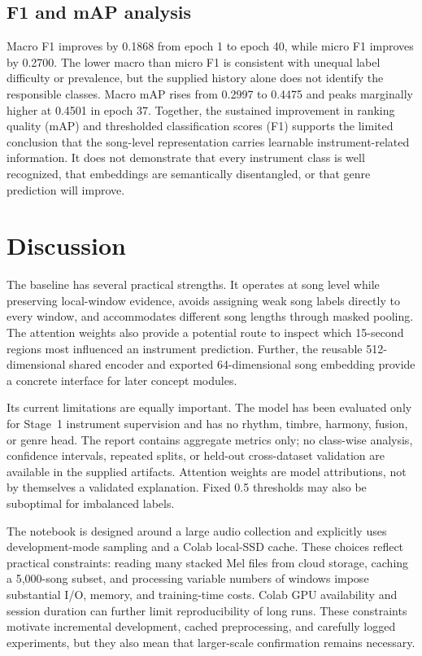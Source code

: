 \documentclass[conference]{IEEEtran}
\begin{document}
\subsection{F1 and mAP analysis}
Macro F1 improves by 0.1868 from epoch 1 to epoch 40, while micro F1 improves by 0.2700. The lower macro than micro F1 is consistent with unequal label difficulty or prevalence, but the supplied history alone does not identify the responsible classes. Macro mAP rises from 0.2997 to 0.4475 and peaks marginally higher at 0.4501 in epoch 37. Together, the sustained improvement in ranking quality (mAP) and thresholded classification scores (F1) supports the limited conclusion that the song-level representation carries learnable instrument-related information. It does not demonstrate that every instrument class is well recognized, that embeddings are semantically disentangled, or that genre prediction will improve.

\section{Discussion}
The baseline has several practical strengths. It operates at song level while preserving local-window evidence, avoids assigning weak song labels directly to every window, and accommodates different song lengths through masked pooling. The attention weights also provide a potential route to inspect which 15-second regions most influenced an instrument prediction. Further, the reusable 512-dimensional shared encoder and exported 64-dimensional song embedding provide a concrete interface for later concept modules.

Its current limitations are equally important. The model has been evaluated only for Stage~1 instrument supervision and has no rhythm, timbre, harmony, fusion, or genre head. The report contains aggregate metrics only; no class-wise analysis, confidence intervals, repeated splits, or held-out cross-dataset validation are available in the supplied artifacts. Attention weights are model attributions, not by themselves a validated explanation. Fixed 0.5 thresholds may also be suboptimal for imbalanced labels.

The notebook is designed around a large audio collection and explicitly uses development-mode sampling and a Colab local-SSD cache. These choices reflect practical constraints: reading many stacked Mel files from cloud storage, caching a 5,000-song subset, and processing variable numbers of windows impose substantial I/O, memory, and training-time costs. Colab GPU availability and session duration can further limit reproducibility of long runs. These constraints motivate incremental development, cached preprocessing, and carefully logged experiments, but they also mean that larger-scale confirmation remains necessary.
\end{document}
